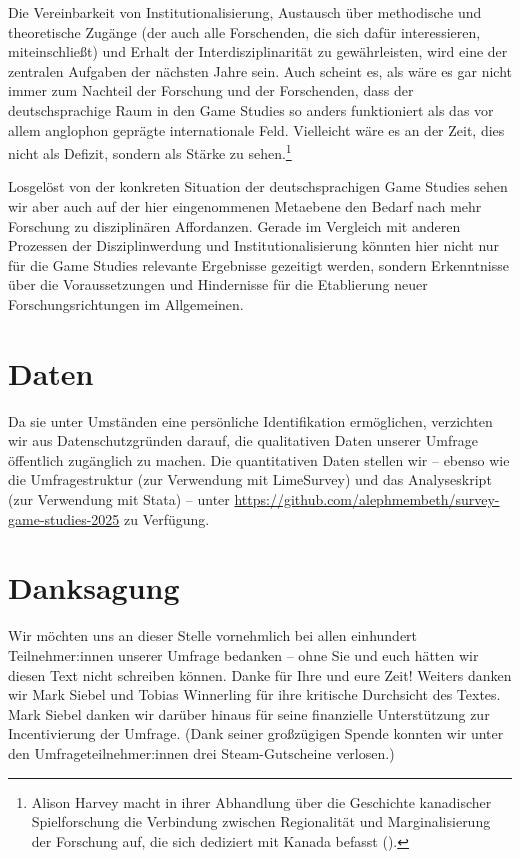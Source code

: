 \documentclass{scrartcl}
\begin{document}
Die Vereinbarkeit von Institutionalisierung, Austausch über methodische und theoretische Zugänge (der auch alle Forschenden, die sich dafür interessieren, miteinschließt) und Erhalt der Interdisziplinarität zu gewährleisten, wird eine der zentralen Aufgaben der nächsten Jahre sein.
Auch scheint es, als wäre es gar nicht immer zum Nachteil der Forschung und der Forschenden, dass der deutschsprachige Raum in den Game Studies so anders funktioniert als das vor allem anglophon geprägte internationale Feld.
Vielleicht wäre es an der Zeit, dies nicht als Defizit, sondern als Stärke zu sehen.\footnote{Alison Harvey macht in ihrer Abhandlung über die Geschichte kanadischer Spielforschung die Verbindung zwischen Regionalität und Marginalisierung der Forschung auf, die sich dediziert mit Kanada befasst (\autocite[vgl.][]{harvey_enquotetheres_2025}).}

Losgelöst von der konkreten Situation der deutschsprachigen Game Studies sehen wir aber auch auf der hier eingenommenen Metaebene den Bedarf nach mehr Forschung zu disziplinären Affordanzen.
Gerade im Vergleich mit anderen Prozessen der Disziplinwerdung und Institutionalisierung könnten hier nicht nur für die Game Studies relevante Ergebnisse gezeitigt werden, sondern Erkenntnisse über die Voraussetzungen und Hindernisse für die Etablierung neuer Forschungsrichtungen im Allgemeinen.


\clearpage
\section*{Daten}
Da sie unter Umständen eine persönliche Identifikation ermöglichen, verzichten wir aus Datenschutzgründen darauf, die qualitativen Daten unserer Umfrage öffentlich zugänglich zu machen.
Die quantitativen Daten stellen wir -- ebenso wie die Umfragestruktur (zur Verwendung mit LimeSurvey) und das Analyseskript (zur Verwendung mit Stata) -- unter \url{https://github.com/alephmembeth/survey-game-studies-2025} zu Verfügung.


\section*{Danksagung}
Wir möchten uns an dieser Stelle vornehmlich bei allen einhundert Teilnehmer:innen unserer Umfrage bedanken -- ohne Sie und euch hätten wir diesen Text nicht schreiben können.
Danke für Ihre und eure Zeit!
Weiters danken wir Mark Siebel und Tobias Winnerling für ihre kritische Durchsicht des Textes.
Mark Siebel danken wir darüber hinaus für seine finanzielle Unterstützung zur Incentivierung der Umfrage.
(Dank seiner großzügigen Spende konnten wir unter den Umfrageteilnehmer:innen drei Steam-Gutscheine verlosen.)
\end{document}
